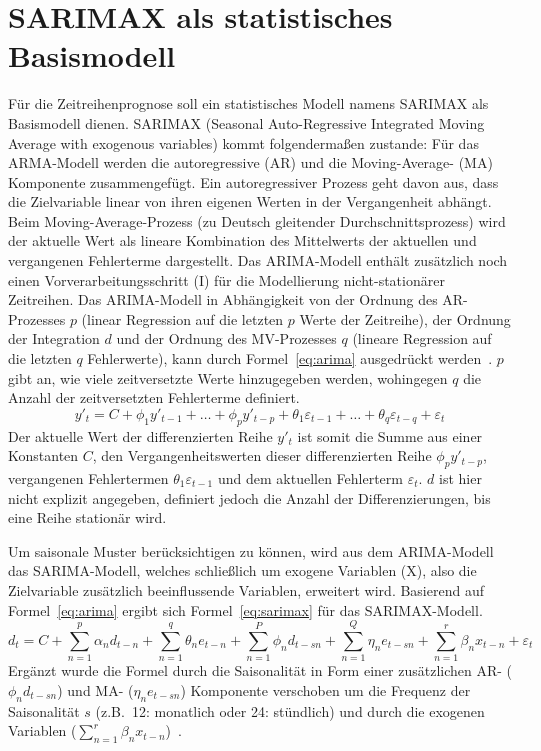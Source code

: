 \section{SARIMAX als statistisches Basismodell}
Für die Zeitreihenprognose soll ein statistisches Modell namens SARIMAX als Basismodell dienen.
SARIMAX (Seasonal Auto-Regressive Integrated Moving Average with exogenous variables) kommt folgendermaßen zustande:
Für das ARMA-Modell werden die autoregressive (AR) und die Moving-Average- (MA) Komponente zusammengefügt.
Ein autoregressiver Prozess geht davon aus, dass die Zielvariable linear von ihren eigenen Werten in der Vergangenheit abhängt.
Beim Moving-Average-Prozess (zu Deutsch gleitender Durchschnittsprozess) wird der aktuelle Wert als lineare Kombination des Mittelwerts der aktuellen und vergangenen Fehlerterme dargestellt.
Das \ac{ARIMA}-Modell enthält zusätzlich noch einen Vorverarbeitungsschritt (I) für die Modellierung nicht-stationärer Zeitreihen.
Das ARIMA-Modell in Abhängigkeit von der Ordnung des AR-Prozesses $p$ (linear Regression auf die letzten $p$ Werte der Zeitreihe), der Ordnung der Integration $d$ und der Ordnung des MV-Prozesses $q$ (lineare Regression auf die letzten $q$ Fehlerwerte), kann durch Formel~\ref{eq:arima} ausgedrückt werden~\cite{Peixeiro.2022}.
$p$ gibt an, wie viele zeitversetzte Werte hinzugegeben werden, wohingegen $q$ die Anzahl der zeitversetzten Fehlerterme definiert.
\begin{equation}
 \label{eq:arima}
 y'_t = C + \phi_1 y'_{t-1} + \ldots + \phi_p y'_{t-p} + \theta_1 \varepsilon_{t-1} + \ldots + \theta_q \varepsilon_{t-q} + \varepsilon_t
\end{equation}
Der aktuelle Wert der differenzierten Reihe $y'_t$ ist somit die Summe aus einer Konstanten $C$, den Vergangenheitswerten dieser differenzierten Reihe $\phi_p y'_{t-p}$, vergangenen Fehlertermen $\theta_1 \varepsilon_{t-1}$ und dem aktuellen Fehlerterm $\varepsilon_t$.
$d$ ist hier nicht explizit angegeben, definiert jedoch die Anzahl der Differenzierungen, bis eine Reihe stationär wird.

Um saisonale Muster berücksichtigen zu können, wird aus dem \ac{ARIMA}-Modell das SARIMA-Modell, welches schließlich um exogene Variablen (X), also die Zielvariable zusätzlich beeinflussende Variablen, erweitert wird.
Basierend auf Formel~\ref{eq:arima} ergibt sich Formel~\ref{eq:sarimax} für das SARIMAX-Modell.
\begin{equation}
 \label{eq:sarimax}
 d_t = C + \sum_{n=1}^{p} \alpha_n d_{t-n} + \sum_{n=1}^{q} \theta_n e_{t-n} + \sum_{n=1}^{P} \phi_n d_{t-sn} + \sum_{n=1}^{Q} \eta_n e_{t-sn} + \sum_{n=1}^{r} \beta_n x_{t-n} + \varepsilon_t
\end{equation}
Ergänzt wurde die Formel durch die Saisonalität in Form einer zusätzlichen AR- ($\phi_n d_{t-sn}$) und MA- ($\eta_n e_{t-sn}$) Komponente verschoben um die Frequenz der Saisonalität $s$ (z.B.\ 12: monatlich oder 24: stündlich) und durch die exogenen Variablen ($\sum_{n=1}^{r} \beta_n x_{t-n}$)~\cite{Artley.26.4.2022}.

